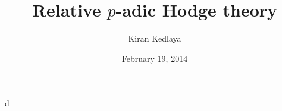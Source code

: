 \documentclass{article}
\title{Relative $p$-adic Hodge theory}
\author{Kiran Kedlaya}
\date{February 19, 2014}
\begin{document}
\maketitle





d
\end{document}

